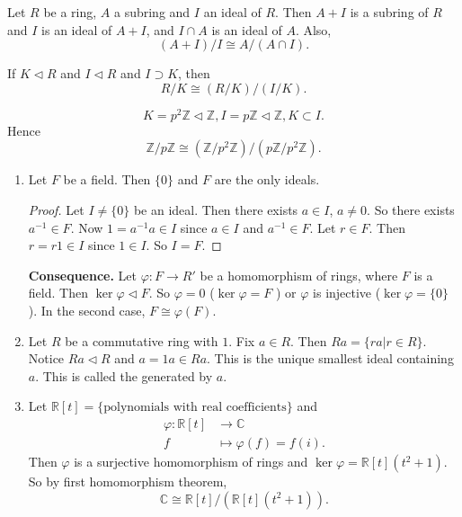 \begin{theorem}
	Let $R$ be a ring, $A$ a subring and $I$ an ideal of $R$. Then $A + I$ is a subring of $R$ and $I$ is an ideal of $A + I$, and $I \cap A$ is an ideal of $A$. Also,
	\[
		\left( A + I \right)  / I \cong A / \left( A \cap I \right) 
	.\] 
\end{theorem}

\begin{theorem}
	If $K\triangleleft R$ and $I \triangleleft R$ and $I \supset K$, then
	\[
		R / K \cong \left( R / K \right) / (I / K)
	.\] 
\end{theorem}

\begin{example}
	\[
		K = p^2 \mathbb{Z} \triangleleft \mathbb{Z}, I = p\mathbb{Z} \triangleleft \mathbb{Z}, K \subset I 
	.\] 
	Hence
	\[
		\mathbb{Z} / p\mathbb{Z} \cong
		\left( \mathbb{Z} / p^2 \mathbb{Z} \right) / \left( p \mathbb{Z} / p^2 \mathbb{Z} \right) 
	.\] 
\end{example}
\begin{example}
	\begin{enumerate}
		\item Let $F$ be a field. Then $\{0\} $ and $F$ are the only ideals.
		\begin{proof}
			Let $I \neq \{0\}  $ be an ideal. Then there exists $a \in I$, $a \neq 0$. So there exists $a^{-1} \in F$. Now $1 = a^{-1} a \in I$ since $a \in I$ and $a^{-1}  \in F$. Let $r \in F$. Then $r = r 1 \in I$ since $1 \in I$. So $I = F$.
		\end{proof}
		\textbf{Consequence.} Let $\varphi: F \to R'$ be a homomorphism of rings, where $F$ is a field. Then $\operatorname{ker} \varphi \triangleleft F$. So $\varphi = 0$ ($\operatorname{ker} \varphi = F$ ) or $\varphi$ is injective ($\operatorname{ker} \varphi = \{0\} $ ). In the second case, $F \cong \varphi(F)$.
	\item Let $R $ be a commutative ring with $1$. Fix $a \in R$. Then $Ra = \{ra| r \in  R\} $. Notice $Ra \triangleleft R$ and $a = 1 a \in R a$. This is the unique smallest ideal containing $a$. This is called the  generated by $a$.
	\item Let $\mathbb{R}[t] = \{\text{polynomials with real coefficients}\} $ and 
		\begin{align*}
			\varphi: \mathbb{R}[t] &\longrightarrow \mathbb{C} \\
			f &\longmapsto \varphi(f) = f(i)
		.\end{align*}
		Then $\varphi$ is a surjective homomorphism of rings and $\operatorname{ker} \varphi = \mathbb{R}[t] (t^2+1)$.
		So by first homomorphism theorem,
		\[
			\mathbb{C} \cong\mathbb{R}[t] / \left( \mathbb{R}[t] (t^2 + 1) \right)
		.\]
		
	\end{enumerate}
\end{example}
